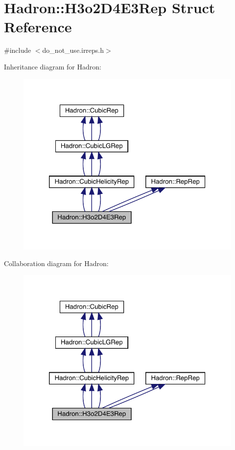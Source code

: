 \hypertarget{structHadron_1_1H3o2D4E3Rep}{}\section{Hadron\+:\+:H3o2\+D4\+E3\+Rep Struct Reference}
\label{structHadron_1_1H3o2D4E3Rep}


{\ttfamily \#include $<$do\+\_\+not\+\_\+use.\+irreps.\+h$>$}



Inheritance diagram for Hadron\+:
\nopagebreak
\begin{figure}[H]
\begin{center}
\leavevmode
\includegraphics[width=320pt]{d1/d22/structHadron_1_1H3o2D4E3Rep__inherit__graph}
\end{center}
\end{figure}


Collaboration diagram for Hadron\+:
\nopagebreak
\begin{figure}[H]
\begin{center}
\leavevmode
\includegraphics[width=320pt]{d6/dae/structHadron_1_1H3o2D4E3Rep__coll__graph}
\end{center}
\end{figure}
